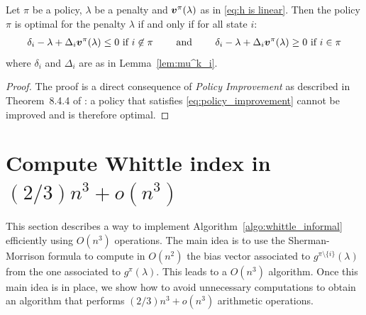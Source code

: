 \documentclass[acmsmall,screen,anonymous]{acmart}
\begin{document}
\begin{lemma}
    \label{lem:test_optimality}
    Let $\pi$ be a policy, $\lambda$ be a penalty and $\boldsymbol{v}^\pi(\lambda)$ as in \eqref{eq:h is linear}. Then the policy $\pi$ is optimal for the penalty $\lambda$ if and only if for all state $i$: 
    \begin{align}
        \label{eq:policy_improvement}
        \delta_i - \lambda + \Delta_i \boldsymbol{v}^\pi(\lambda) \le0 \text{ if $i\not\in\pi$}\qquad \text{ and }\qquad
        \delta_i - \lambda + \Delta_i \boldsymbol{v}^\pi(\lambda) \ge0 \text{ if $i\in\pi$}
    \end{align}
    where $\delta_i$ and $\Delta_i$ are as in Lemma~\ref{lem:mu^k_i}. 
\end{lemma}
\begin{proof}
    The proof is a direct consequence of {\it Policy Improvement} as described in Theorem~8.4.4 of \cite{putermanMarkovDecisionProcesses1994}: a policy that satisfies \eqref{eq:policy_improvement} cannot be improved and is therefore optimal.
\end{proof}


\section{Compute Whittle index in $(2/3)n^3 + o(n^3)$}
\label{sec:formal_widx_algo}

This section describes a way to implement Algorithm~\ref{algo:whittle_informal}  efficiently using  $O(n^3)$ operations. The main idea is to use the Sherman-Morrison formula to compute in $O(n^2)$ the bias vector associated to $g^{\pi\setminus\{i\}}(\lambda)$ from the one associated to $g^{\pi}(\lambda)$. This leads to a $O(n^3)$ algorithm. Once this main idea is in place, we show how to avoid unnecessary computations to obtain an algorithm that performs $(2/3)n^3+o(n^3)$ arithmetic operations.
\end{document}
